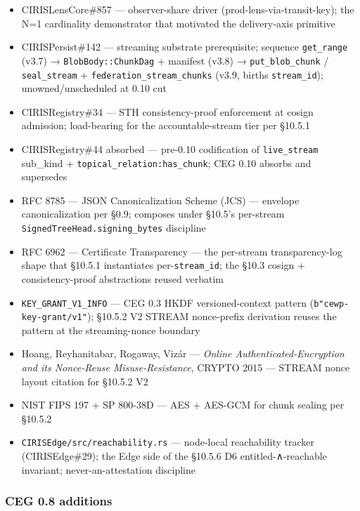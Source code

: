 \documentclass[10pt]{article}
\begin{document}
\begin{itemize}\setlength\itemsep{0pt}
\item CIRISLensCore\#857 — observer-share driver (prod-lens-via-transit-key); the N=1 cardinality demonstrator that motivated the delivery-axis primitive
\item CIRISPersist\#142 — streaming substrate prerequisite; sequence \texttt{get\_range} (v3.7) → \texttt{BlobBody::ChunkDag} + manifest (v3.8) → \texttt{put\_blob\_chunk} / \texttt{seal\_stream} + \texttt{federation\_stream\_chunks} (v3.9, births \texttt{stream\_id}); unowned/unscheduled at 0.10 cut
\item CIRISRegistry\#34 — STH consistency-proof enforcement at cosign admission; load-bearing for the accountable-stream tier per §10.5.1
\item CIRISRegistry\#44 absorbed — pre-0.10 codification of \texttt{live\_stream} sub\_kind + \texttt{topical\_relation:has\_chunk}; CEG 0.10 absorbs and supersedes
\item RFC 8785 — JSON Canonicalization Scheme (JCS) — envelope canonicalization per §0.9; composes under §10.5's per-stream \texttt{SignedTreeHead.signing\_bytes} discipline
\item RFC 6962 — Certificate Transparency — the per-stream transparency-log shape that §10.5.1 instantiates per-\texttt{stream\_id}; the §10.3 cosign + consistency-proof abstractions reused verbatim
\item \texttt{KEY\_GRANT\_V1\_INFO} — CEG 0.3 HKDF versioned-context pattern (\texttt{b"cewp-key-grant/v1"}); §10.5.2 V2 STREAM nonce-prefix derivation reuses the pattern at the streaming-nonce boundary
\item Hoang, Reyhanitabar, Rogaway, Vizár — \textit{Online Authenticated-Encryption and its Nonce-Reuse Misuse-Resistance}, CRYPTO 2015 — STREAM nonce layout citation for §10.5.2 V2
\item NIST FIPS 197 + SP 800-38D — AES + AES-GCM for chunk sealing per §10.5.2
\item \texttt{CIRISEdge/src/reachability.rs} — node-local reachability tracker (CIRISEdge\#29); the Edge side of the §10.5.6 D6 entitled-∧-reachable invariant; never-an-attestation discipline
\end{itemize}


\subsubsection*{CEG 0.8 additions}
\end{document}
